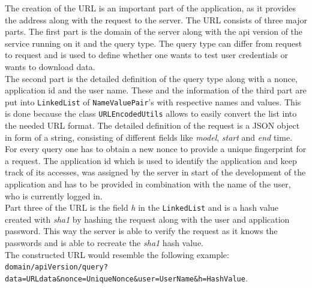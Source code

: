 The  creation of the URL is an important part of the application, as it provides the address along with the request to the server. The URL consists of three major parts. The first part is the domain of the server along with the api version of the service running on it and the query type. The query type can differ from request to request and is used to define whether one wants to test user credentials or wants to download data.\\
The second part is the detailed definition of the query type along with a nonce, application id and the user name. These and the information of the third part are put into \lstinline$LinkedList$ of \lstinline$NameValuePair$'s with respective names and values. This is done because the class \lstinline$URLEncodedUtils$ allows to easily convert the list into the needed URL format. The detailed definition of the request is a JSON object in form of a string, consisting of different fields like \emph{model}, \emph{start} and \emph{end} time. For every query one has to obtain a new nonce to provide a unique fingerprint for a request. The application id which is used to identify the application and keep track of its accesses, was assigned by the server in start of the development of the application and has to be provided in combination with the name of the user, who is currently logged in.\\
Part three of the URL is the field \emph{h} in the \lstinline$LinkedList$ and is a hash value created with \emph{sha1} by hashing the request along with the user and application password. This way the server is able to verify the request as it knows the passwords and is able to recreate the \emph{sha1} hash value.\\
The constructed URL would resemble the following example: \nolinkurl{domain/apiVersion/query?data=URLdata&nonce=UniqueNonce&user=UserName&h=HashValue}.

